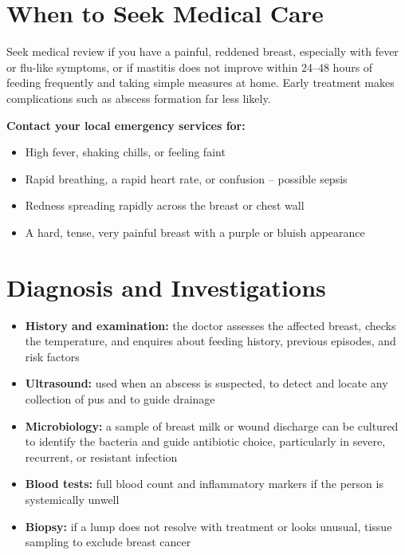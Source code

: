 \section*{When to Seek Medical Care}
Seek medical review if you have a painful, reddened breast, especially with fever or flu-like symptoms, or if mastitis does not improve within 24--48 hours of feeding frequently and taking simple measures at home. Early treatment makes complications such as abscess formation far less likely.

\textbf{Contact your local emergency services for:}
\begin{itemize}
    \item High fever, shaking chills, or feeling faint
    \item Rapid breathing, a rapid heart rate, or confusion -- possible sepsis
    \item Redness spreading rapidly across the breast or chest wall
    \item A hard, tense, very painful breast with a purple or bluish appearance
\end{itemize}

\section*{Diagnosis and Investigations}
\begin{itemize}
    \item \textbf{History and examination:} the doctor assesses the affected breast, checks the temperature, and enquires about feeding history, previous episodes, and risk factors
    \item \textbf{Ultrasound:} used when an abscess is suspected, to detect and locate any collection of pus and to guide drainage
    \item \textbf{Microbiology:} a sample of breast milk or wound discharge can be cultured to identify the bacteria and guide antibiotic choice, particularly in severe, recurrent, or resistant infection
    \item \textbf{Blood tests:} full blood count and inflammatory markers if the person is systemically unwell
    \item \textbf{Biopsy:} if a lump does not resolve with treatment or looks unusual, tissue sampling to exclude breast cancer
\end{itemize}

